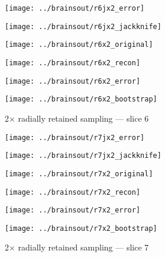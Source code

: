 \documentclass[review,supplement,onefignum,onetabnum,juq]{siamonline181217}
\begin{document}
\begin{figure}
\begin{centering}

\parbox{\imsize}{\texttt{[image: ../brainsout/r6jx2\_error]}}
\parbox{\imsize}{\texttt{[image: ../brainsout/r6jx2\_jackknife]}}

\vspace{\vertsep}

\parbox{\imsize}{\texttt{[image: ../brainsout/r6x2\_original]}}
\parbox{\imsize}{\texttt{[image: ../brainsout/r6x2\_recon]}}

\vspace{\vertsep}

\parbox{\imsize}{\texttt{[image: ../brainsout/r6x2\_error]}}
\parbox{\imsize}{\texttt{[image: ../brainsout/r6x2\_bootstrap]}}

\end{centering}
\caption{2$\times$ radially retained sampling --- slice 6}
\end{figure}


\begin{figure}
\begin{centering}

\parbox{\imsize}{\texttt{[image: ../brainsout/r7jx2\_error]}}
\parbox{\imsize}{\texttt{[image: ../brainsout/r7jx2\_jackknife]}}

\vspace{\vertsep}

\parbox{\imsize}{\texttt{[image: ../brainsout/r7x2\_original]}}
\parbox{\imsize}{\texttt{[image: ../brainsout/r7x2\_recon]}}

\vspace{\vertsep}

\parbox{\imsize}{\texttt{[image: ../brainsout/r7x2\_error]}}
\parbox{\imsize}{\texttt{[image: ../brainsout/r7x2\_bootstrap]}}

\end{centering}
\caption{2$\times$ radially retained sampling --- slice 7}
\end{figure}
\end{document}

